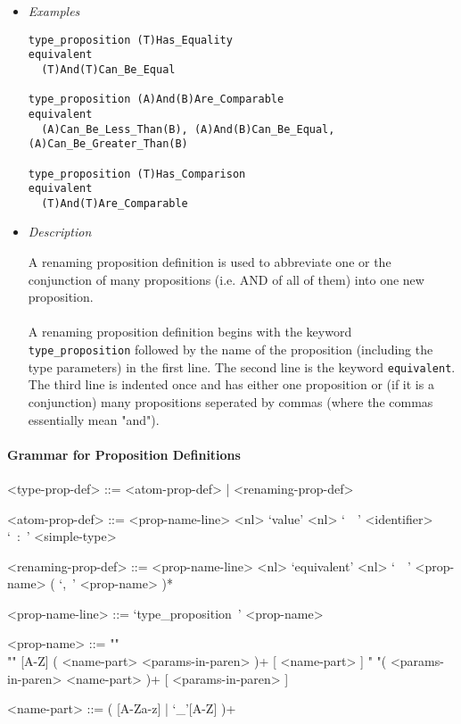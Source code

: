 \documentclass{article}
\begin{document}
\begin{itemize}
\item \textit{Examples}
\begin{verbatim}
type_proposition (T)Has_Equality
equivalent
  (T)And(T)Can_Be_Equal

type_proposition (A)And(B)Are_Comparable
equivalent
  (A)Can_Be_Less_Than(B), (A)And(B)Can_Be_Equal, (A)Can_Be_Greater_Than(B)

type_proposition (T)Has_Comparison
equivalent
  (T)And(T)Are_Comparable
\end{verbatim}

\item \textit{Description}

A renaming proposition definition is used to abbreviate one or the conjunction
of many propositions (i.e. AND of all of them) into one new proposition.
\\\\
A renaming proposition definition begins with the keyword
\texttt{type_proposition} followed by the name of the proposition (including
the type parameters) in the first line. The second line is the keyword
\texttt{equivalent}. The third line is indented once and has either one
proposition or (if it is a conjunction) many propositions  seperated by commas
(where the commas essentially mean "and").

\end{itemize}

\paragraph{Grammar for Proposition Definitions}

\begin{grammar}
<type-prop-def> ::= <atom-prop-def> | <renaming-prop-def>

<atom-prop-def> ::=
<prop-name-line> <nl> `value' <nl> `\ \ ' <identifier> `\ :\ ' <simple-type>

<renaming-prop-def> ::=
<prop-name-line> <nl> `equivalent' <nl> `\ \ ' <prop-name> ( `,\ ' <prop-name> )*

<prop-name-line> ::= `type_proposition\ ' <prop-name>

<prop-name> ::=  ""\\""
[A-Z] ( <name-part> <params-in-paren> )+ [ <name-part> ]
\alt " "( <params-in-paren> <name-part> )+ [ <params-in-paren> ]

<name-part> ::= ( [A-Za-z] | `_'[A-Z] )+
\end{grammar} 
\end{document}
